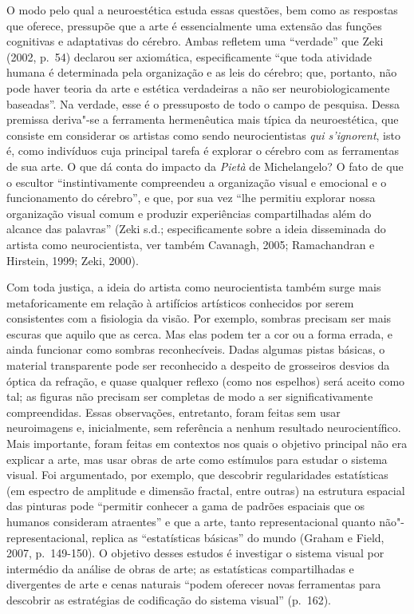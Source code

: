 O modo pelo qual a neuroestética estuda essas questões, bem como as
respostas que oferece, pressupõe que a arte é essencialmente uma
extensão das funções cognitivas e adaptativas do cérebro. Ambas refletem
uma ``verdade'' que Zeki (2002, p.~54) declarou ser axiomática,
especificamente ``que toda atividade humana é determinada pela
organização e as leis do cérebro; que, portanto, não pode haver teoria
da arte e estética verdadeiras a não ser neurobiologicamente baseadas''.
Na verdade, esse é o pressuposto de todo o campo de pesquisa. Dessa
premissa deriva"-se a ferramenta hermenêutica mais típica da
neuroestética, que consiste em considerar os artistas como sendo
neurocientistas \emph{qui s'ignorent}, isto é, como indivíduos cuja
principal tarefa é explorar o cérebro com as ferramentas de sua arte. O
que dá conta do impacto da \emph{Pietà} de Michelangelo? O fato de que o
escultor ``instintivamente compreendeu a organização visual e emocional
e o funcionamento do cérebro'', e que, por sua vez ``lhe permitiu
explorar nossa organização visual comum e produzir experiências
compartilhadas além do alcance das palavras'' (Zeki s.d.;
especificamente sobre a ideia disseminada do artista como
neurocientista, ver também Cavanagh, 2005; Ramachandran e Hirstein,
1999; Zeki, 2000).

Com toda justiça, a ideia do artista como neurocientista também surge
mais metaforicamente em relação à artifícios artísticos conhecidos por
serem consistentes com a fisiologia da visão. Por exemplo, sombras
precisam ser mais escuras que aquilo que as cerca. Mas elas podem ter a
cor ou a forma errada, e ainda funcionar como sombras reconhecíveis.
Dadas algumas pistas básicas, o material transparente pode ser
reconhecido a despeito de grosseiros desvios da óptica da refração, e
quase qualquer reflexo (como nos espelhos) será aceito como tal; as
figuras não precisam ser completas de modo a ser significativamente
compreendidas. Essas observações, entretanto, foram feitas sem usar
neuroimagens e, inicialmente, sem referência a nenhum resultado
neurocientífico. Mais importante, foram feitas em contextos nos quais o
objetivo principal não era explicar a arte, mas usar obras de arte como
estímulos para estudar o sistema visual. Foi argumentado, por exemplo,
que descobrir regularidades estatísticas (em espectro de amplitude e
dimensão fractal, entre outras) na estrutura espacial das pinturas pode
``permitir conhecer a gama de padrões espaciais que os humanos
consideram atraentes'' e que a arte, tanto representacional quanto
não"-representacional, replica as ``estatísticas básicas'' do mundo
(Graham e Field, 2007, p.~149-150). O objetivo desses estudos é
investigar o sistema visual por intermédio da análise de obras de arte;
as estatísticas compartilhadas e divergentes de arte e cenas naturais
``podem oferecer novas ferramentas para descobrir as estratégias de
codificação do sistema visual'' (p.~162).

